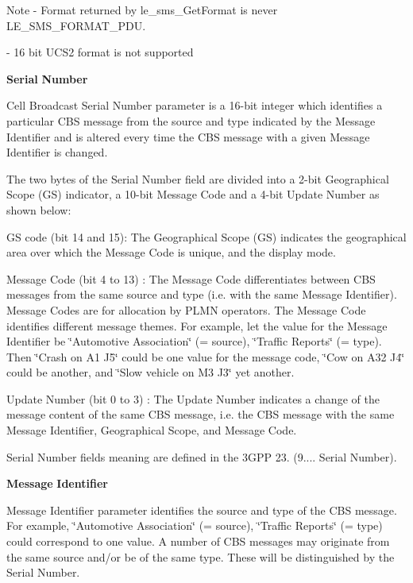 \begin{DoxyNote}{Note}
-\/ Format returned by le\+\_\+sms\+\_\+\+Get\+Format is never L\+E\+\_\+\+S\+M\+S\+\_\+\+F\+O\+R\+M\+A\+T\+\_\+\+P\+D\+U. 

-\/ 16 bit U\+C\+S2 format is not supported
\end{DoxyNote}
{\bfseries Serial} {\bfseries Number} 

Cell Broadcast Serial Number parameter is a 16-\/bit integer which identifies a particular C\+B\+S message from the source and type indicated by the Message Identifier and is altered every time the C\+B\+S message with a given Message Identifier is changed.

The two bytes of the Serial Number field are divided into a 2-\/bit Geographical Scope (G\+S) indicator, a 10-\/bit Message Code and a 4-\/bit Update Number as shown below\+:


\begin{DoxyItemize}
\item G\+S code (bit 14 and 15)\+: The Geographical Scope (G\+S) indicates the geographical area over which the Message Code is unique, and the display mode.
\item Message Code (bit 4 to 13) \+: The Message Code differentiates between C\+B\+S messages from the same source and type (i.\+e. with the same Message Identifier). Message Codes are for allocation by P\+L\+M\+N operators. The Message Code identifies different message themes. For example, let the value for the Message Identifier be \char`\"{}\+Automotive Association\char`\"{} (= source), \char`\"{}\+Traffic Reports\char`\"{} (= type). Then \char`\"{}\+Crash on A1 J5\char`\"{} could be one value for the message code, \char`\"{}\+Cow on A32 J4\char`\"{} could be another, and \char`\"{}\+Slow vehicle on M3 J3\char`\"{} yet another.
\item Update Number (bit 0 to 3) \+: The Update Number indicates a change of the message content of the same C\+B\+S message, i.\+e. the C\+B\+S message with the same Message Identifier, Geographical Scope, and Message Code.
\end{DoxyItemize}

Serial Number fields meaning are defined in the 3\+G\+P\+P 23. (9.... Serial Number).

{\bfseries Message} {\bfseries Identifier} 

Message Identifier parameter identifies the source and type of the C\+B\+S message. For example, \char`\"{}\+Automotive Association\char`\"{} (= source), \char`\"{}\+Traffic Reports\char`\"{} (= type) could correspond to one value. A number of C\+B\+S messages may originate from the same source and/or be of the same type. These will be distinguished by the Serial Number.

